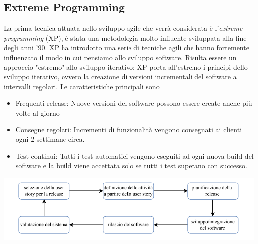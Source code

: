 \documentclass[10pt, letterpaper]{report}
\begin{document}
\subsection{Extreme Programming}
La prima tecnica attuata nello sviluppo agile che verrà considerata è l'\textit{extreme programming} (XP), è stata una metodologia  molto influente sviluppata alla fine degli anni '90. XP ha introdotto una serie di tecniche agili che hanno fortemente influenzato il modo in cui pensiamo allo sviluppo software. 
Risulta essere un approccio "estremo" allo sviluppo iterativo: XP porta all'estremo i principi dello sviluppo iterativo, ovvero la creazione di versioni incrementali del software a intervalli regolari. Le caratteristiche principali sono\begin{itemize}
    \item Frequenti release: Nuove versioni del software possono essere create anche più volte al giorno
    \item Consegne regolari: Incrementi di funzionalità vengono consegnati ai clienti ogni 2 settimane circa.
    \item Test continui: Tutti i test automatici vengono eseguiti ad ogni nuova build del software e la build viene accettata solo se tutti i test superano con successo.
\end{itemize}\begin{center}
    \includegraphics[width=1\textwidth ]{images/XP.pdf}
\end{center}
\end{document}
